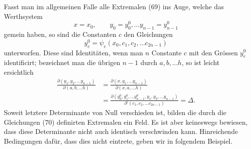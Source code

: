 \documentclass[11pt,a4paper,leqno]{article}
\begin{document}
Fasst man im allgemeinen Falle alle Extremalen (69) ins
Auge, welche das Werthsystem
\[
x=x_0,\qquad y_0=y_0^0,\ldots y_{n-1}=y_{n-1}^0
\]
gemein haben, so sind die Constanten $c$ den Gleichungen
\begin{equation}\tag{70}
y_e^0=\psi_e(x_0,c_1,c_2,\ldots c_{2n-1})
\end{equation}
unterworfen. Diese sind Identitäten, wenn man $n$ Constante $c$
mit den Grössen $y_e^0$ identificirt; bezeichnet man die übrigen
$n-1$ durch $a,b,\ldots h$, so ist leicht ersichtlich
\[
\begin{aligned}
\frac{\partial(y_1,y_2,\ldots y_{n-1})}{\partial(a,b,\ldots h)}
&=\frac{\partial(x,y_1,\ldots y_{n-1})}{\partial(x,a,\ldots h)}\\
&=\frac{\partial(y_0^0,y_1^0,\ldots y_{n-1}^0,y_1,y_2,\ldots y_{n-1})}
{\partial'(c_1,c_2,\ldots c_{2n-1})}=\Delta.
\end{aligned}
\]
Soweit letztere Determinante von Null verschieden ist, bilden
die durch die Gleichungen (70) definirten Extremalen ein Feld.
Es ist aber keineswegs bewiesen, dass diese Determinante
nicht auch identisch verschwinden kann. Hinreichende Bedingungen
dafür, dass dies nicht eintrete, geben wir in folgendem
Beispiel.
\end{document}
